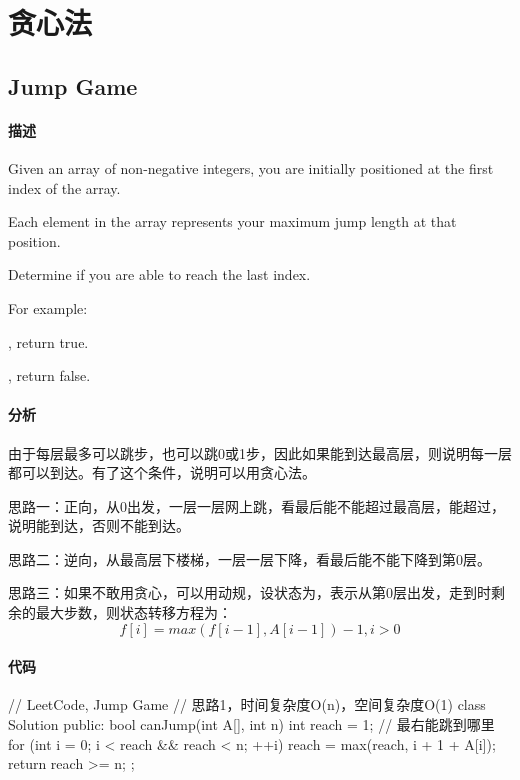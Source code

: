 \chapter{贪心法}


\section{Jump Game} %
\label{sec:jump-game}


\subsubsection{描述}
Given an array of non-negative integers, you are initially positioned at the first index of the array.

Each element in the array represents your maximum jump length at that position.

Determine if you are able to reach the last index.

For example:

, return true.

, return false.


\subsubsection{分析}
由于每层最多可以跳步，也可以跳0或1步，因此如果能到达最高层，则说明每一层都可以到达。有了这个条件，说明可以用贪心法。

思路一：正向，从0出发，一层一层网上跳，看最后能不能超过最高层，能超过，说明能到达，否则不能到达。

思路二：逆向，从最高层下楼梯，一层一层下降，看最后能不能下降到第0层。

思路三：如果不敢用贪心，可以用动规，设状态为，表示从第0层出发，走到时剩余的最大步数，则状态转移方程为：
$$
f[i] = max(f[i-1], A[i-1])-1, i > 0
$$

\subsubsection{代码}
\begin{Code}
// LeetCode, Jump Game
// 思路1，时间复杂度O(n)，空间复杂度O(1)
class Solution {
public:
    bool canJump(int A[], int n) {
        int reach = 1; // 最右能跳到哪里
        for (int i = 0; i < reach && reach < n; ++i)
            reach = max(reach,  i + 1 + A[i]);
        return reach >= n;
    }
};
\end{Code}

